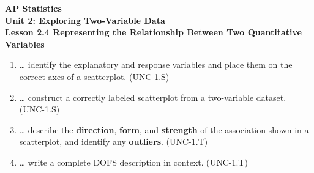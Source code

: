 \documentclass[10pt]{article}
\begin{document}
\vspace{-0.8in}

\begin{center}
  {\color{white}\textbf{\LARGE AP Statistics}}\\[4pt]
  {\color{skymid}\large\textbf{Unit 2: Exploring Two-Variable Data}}\\[6pt]
  {\color{white}\textbf{\large Lesson 2.4 \quad Representing the Relationship Between Two Quantitative Variables}}
\end{center}

\vspace{0.22in}

\namedateperiod

\vspace{0.18in}

\begin{learningtargetbox}
\small
\begin{enumerate}[leftmargin=1.5em, itemsep=5pt]
  \item \ldots{} identify the explanatory and response variables and place them on the correct
        axes of a scatterplot. \hfill\textcolor{slate}{\small(UNC-1.S)}
  \item \ldots{} construct a correctly labeled scatterplot from a two-variable dataset.
        \hfill\textcolor{slate}{\small(UNC-1.S)}
  \item \ldots{} describe the \textbf{direction}, \textbf{form}, and \textbf{strength} of the
        association shown in a scatterplot, and identify any \textbf{outliers}.
        \hfill\textcolor{slate}{\small(UNC-1.T)}
  \item \ldots{} write a complete DOFS description in context.
        \hfill\textcolor{slate}{\small(UNC-1.T)}
\end{enumerate}
\end{learningtargetbox}

\vspace{0.14in}
\end{document}
